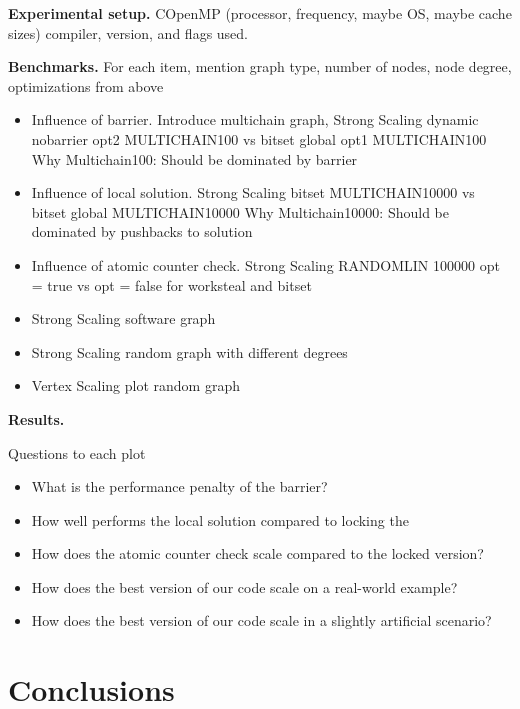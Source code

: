 \documentclass[letterpaper]{article}
\newcommand{\Cpp}{C\nolinebreak[4]\hspace{-.05em}\raisebox{.2ex}{\small \bf ++}}
\newcommand{\mypar}[1]{{\bf #1.}}
\begin{document}
\begin{invisible}
 \mypar{Experimental setup}
 \Cpp  OpenMP
 (processor, frequency, maybe OS, maybe cache sizes)
 compiler, version, and flags used.

 \mypar{Benchmarks}
 For each item, mention graph type, number of nodes, node degree, optimizations from above
 \begin{itemize}
  \item Influence of barrier. Introduce multichain graph, Strong Scaling dynamic nobarrier opt2 MULTICHAIN100 vs bitset global opt1 MULTICHAIN100 Why Multichain100: Should be dominated by barrier%
  \item Influence of local solution. Strong Scaling bitset MULTICHAIN10000 vs bitset global MULTICHAIN10000 Why Multichain10000: Should be dominated by pushbacks to solution
  \item Influence of atomic counter check. Strong Scaling RANDOMLIN 100000 opt = true vs opt = false for worksteal and bitset
  \item Strong Scaling software graph \cite{musco2014generative}
  \item Strong Scaling random graph with different degrees
  \item Vertex Scaling plot random graph
 \end{itemize}

\mypar{Results}

Questions to each plot
\begin{itemize}
 \item What is the performance penalty of the barrier?
 \item How well performs the local solution compared to locking the 
 \item How does the atomic counter check scale compared to the locked version?
 \item How does the best version of our code scale on a real-world example?
 \item How does the best version of our code scale in a slightly artificial scenario?
\end{itemize}
\end{invisible}


\section{Conclusions}
\end{document}
